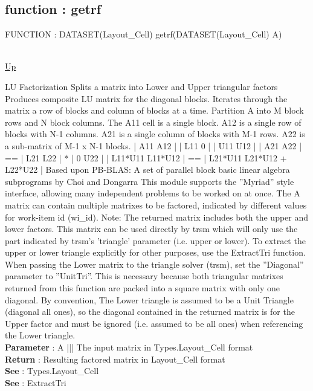 \subsection*{function : getrf}
\hypertarget{ecldoc:pbblas.getrf}{FUNCTION : DATASET(Layout\_Cell) getrf(DATASET(Layout\_Cell) A)} \\
\hyperlink{ecldoc:}{Up} \\
\par
LU Factorization Splits a matrix into Lower and Upper triangular factors Produces composite LU matrix for the diagonal blocks. Iterates through the matrix a row of blocks and column of blocks at a time. Partition A into M block rows and N block columns. The A11 cell is a single block. A12 is a single row of blocks with N-1 columns. A21 is a single column of blocks with M-1 rows. A22 is a sub-matrix of M-1 x N-1 blocks. | A11 A12 | | L11 0 | | U11 U12 | | A21 A22 | == | L21 L22 | * | 0 U22 | | L11*U11 L11*U12 | == | L21*U11 L21*U12 + L22*U22 | Based upon PB-BLAS: A set of parallel block basic linear algebra subprograms by Choi and Dongarra This module supports the ''Myriad'' style interface, allowing many independent problems to be worked on at once. The A matrix can contain multiple matrixes to be factored, indicated by different values for work-item id (wi\_id). Note: The returned matrix includes both the upper and lower factors. This matrix can be used directly by trsm which will only use the part indicated by trsm's 'triangle' parameter (i.e. upper or lower). To extract the upper or lower triangle explicitly for other purposes, use the ExtractTri function. When passing the Lower matrix to the triangle solver (trsm), set the ''Diagonal'' parameter to ''UnitTri''. This is necessary because both triangular matrixes returned from this function are packed into a square matrix with only one diagonal. By convention, The Lower triangle is assumed to be a Unit Triangle (diagonal all ones), so the diagonal contained in the returned matrix is for the Upper factor and must be ignored (i.e. assumed to be all ones) when referencing the Lower triangle. \\
\textbf{Parameter} : A ||| The input matrix in Types.Layout\_Cell format \\
\textbf{Return} : Resulting factored matrix in Layout\_Cell format \\
\textbf{See} : Types.Layout\_Cell \\
\textbf{See} : ExtractTri \\
